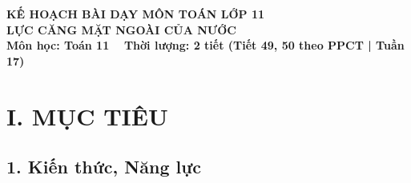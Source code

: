 \documentclass[12pt, a4paper]{article}
\begin{document}
\begin{center}
    {\fontsize{14pt}{17pt}\selectfont \textbf{KẾ HOẠCH BÀI DẠY MÔN TOÁN LỚP 11}}\\[6pt]
    {\fontsize{16pt}{19pt}\selectfont \textbf{LỰC CĂNG MẶT NGOÀI CỦA NƯỚC}}\\[4pt]
    {\fontsize{12pt}{15pt}\selectfont \textbf{Môn học: Toán 11} \ \textbar \ \textbf{Thời lượng: 2 tiết (Tiết 49, 50 theo PPCT | Tuần 17)}}
\end{center}

\vspace{5pt}

\section*{I. MỤC TIÊU}

\subsection*{1. Kiến thức, Năng lực}
\end{document}
